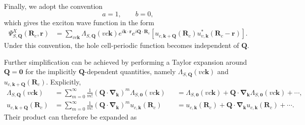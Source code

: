 Finally, we adopt the convention
\[
a=1,
\qquad
b=0,
\]
which gives the exciton wave function in the form
\begin{equation}
\begin{aligned}
\Psi^{X}_{S,\boldsymbol{Q}}
(\boldsymbol{R}_c,\boldsymbol{r})
&=
\sum_{vc\boldsymbol{k}}
\Lambda_{S,\boldsymbol{Q}}(vc\boldsymbol{k})
e^{i\boldsymbol{k}\cdot\boldsymbol{r}}
e^{i\boldsymbol{Q}\cdot\boldsymbol{R}_c}
\left[
u_{c,\boldsymbol{k}+\boldsymbol{Q}}
(\boldsymbol{R}_c)
u^{*}_{v,\boldsymbol{k}}
(\boldsymbol{R}_c-\boldsymbol{r})
\right].
\end{aligned}
\label{excitonWF4}
\end{equation}
Under this convention, the hole cell-periodic function becomes independent of $\boldsymbol{Q}$.

Further simplification can be achieved by performing a Taylor expansion around $\boldsymbol{Q}=\boldsymbol{0}$ for the implicitly $\boldsymbol{Q}$-dependent quantities, namely $\Lambda_{S,\boldsymbol{Q}}(vc\boldsymbol{k})$ and $u_{c,\boldsymbol{k}+\boldsymbol{Q}}(\boldsymbol{R}_c)$. Explicitly,
\begin{equation}
\begin{aligned}
\Lambda_{S,\boldsymbol{Q}}(vc\boldsymbol{k})
&=
\sum_{m=0}^{\infty}
\frac{1}{m!}
\left(
\boldsymbol{Q}\cdot
\boldsymbol{\nabla}_{\boldsymbol{k}}
\right)^m
\Lambda_{S,\boldsymbol{0}}(vc\boldsymbol{k})
&&=
\Lambda_{S,\boldsymbol{0}}(vc\boldsymbol{k})
+
\boldsymbol{Q}\cdot
\boldsymbol{\nabla}_{\boldsymbol{k}}
\Lambda_{S,\boldsymbol{0}}(vc\boldsymbol{k})
+\cdots,
\\[0.5em]
u_{c,\boldsymbol{k}+\boldsymbol{Q}}(\boldsymbol{R}_c)
&=
\sum_{m=0}^{\infty}
\frac{1}{m!}
\left(
\boldsymbol{Q}\cdot
\boldsymbol{\nabla}_{\boldsymbol{k}}
\right)^m
u_{c,\boldsymbol{k}}(\boldsymbol{R}_c)
&&=
u_{c,\boldsymbol{k}}(\boldsymbol{R}_c)
+
\boldsymbol{Q}\cdot
\boldsymbol{\nabla}_{\boldsymbol{k}}
u_{c,\boldsymbol{k}}(\boldsymbol{R}_c)
+\cdots.
\end{aligned}
\label{Taylorindi}
\end{equation}
Their product can therefore be expanded as
